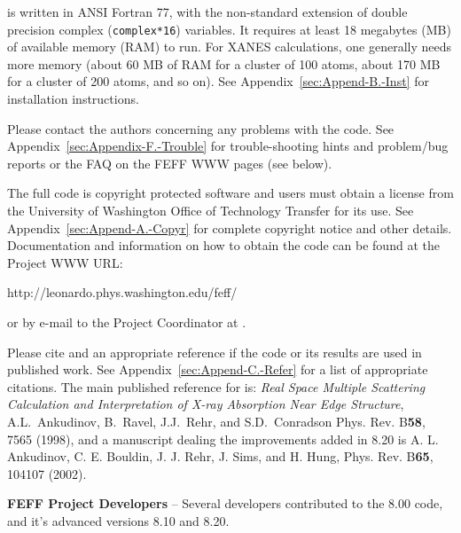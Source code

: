 \documentclass[11pt,oneside]{report} %
\begin{document}
{\feff} is written in ANSI Fortran 77, with the non-standard extension
of double precision complex (\texttt{complex*16}) variables. It requires at
least 18 megabytes (MB) of available memory (RAM) to run. For XANES
calculations, one generally needs more memory (about 60 MB of RAM for
a cluster of 100 atoms, about 170 MB for a cluster of 200 atoms, and
so on). See Appendix~\ref{sec:Append-B.-Inst} for installation instructions.

Please contact the authors concerning any problems with the code.  See
Appendix~\ref{sec:Appendix-F.-Trouble} for trouble-shooting hints and
problem/bug reports or the FAQ on the FEFF WWW pages (see below).

The full {\feffcur} code is copyright protected software and users must
obtain a
license from the University of Washington Office of Technology
Transfer for its use. 
See Appendix~\ref{sec:Append-A.-Copyr} for
complete copyright notice and other details.  Documentation and
information on how to obtain the code can be found at the {\feff}
Project WWW URL:

\centerline{
  {http://leonardo.phys.washington.edu/feff/}}

\noindent or by e-mail to the {\feff} Project Coordinator at
.


Please cite {\feff} and an appropriate {\feff} reference if the code
or its results are used in published work.  See
Appendix~\ref{sec:Append-C.-Refer} for a list of appropriate
citations. The main published reference for {\feffcur} is: \emph{ Real
  Space Multiple Scattering Calculation and Interpretation of X-ray
  Absorption Near Edge Structure}, A.L.~Ankudinov, B.~Ravel,
J.J.~Rehr, and S.D.~Conradson Phys. Rev.  B\textbf{58}, 7565 (1998),
and a manuscript dealing the improvements added in {\feff}8.20
is A. L. Ankudinov, C. E. Bouldin, J. J. Rehr, J. Sims, and  H. Hung,
Phys. Rev. B\textbf{65}, 104107 (2002).

 {\bf FEFF Project Developers} -- Several developers contributed to
the {\feff}8.00 code, and it's advanced versions {\feff}8.10 and {\feff}8.20.
\end{document}

